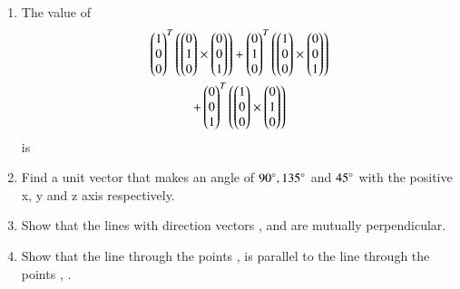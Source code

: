 \begin{enumerate}[label=\arabic*.,ref=\thesubsection.\theenumi]
\item The value of 
\begin{multline}
\begin{pmatrix}1\\0\\0\end{pmatrix}^T\left(\begin{pmatrix}0\\1\\0\end{pmatrix}\times \begin{pmatrix}0\\0\\1\end{pmatrix}\right)
+\begin{pmatrix}0\\1\\0\end{pmatrix}^T\left(\begin{pmatrix}1\\0\\0\end{pmatrix}\times \begin{pmatrix}0\\0\\1\end{pmatrix}\right)
\\
+\begin{pmatrix}0\\0\\1\end{pmatrix}^T\left(\begin{pmatrix}1\\0\\0\end{pmatrix}\times \begin{pmatrix}0\\1\\0\end{pmatrix}\right)
\end{multline}
%
is 
\begin{enumerate}[itemsep = 2pt]
\end{enumerate}
\item Find a unit vector that makes an angle of $90\degree, 135\degree$ and $45\degree$ with the positive x, y and z axis respectively.
\item Show that the lines with direction vectors ,  and  are mutually perpendicular.
\item Show that the line through the points ,  is parallel to the line through the points   , .

\end{enumerate}
